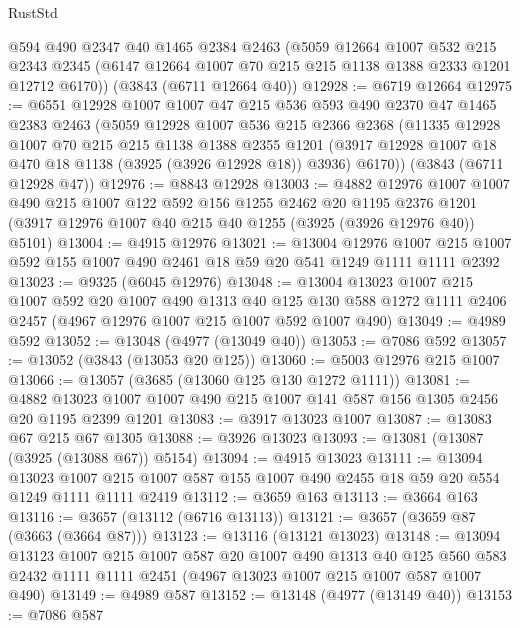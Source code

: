 \begin{lexlean}{RustStd}
\begin{coremodule}
    @594
    @490
    @2347
    @40
    @1465
    @2384
    @2463
    (@5059
      @12664
      @1007
      @532
      @215
      @2343
      @2345
      (@6147 @12664 @1007 @70 @215 @215 @1138 @1388 @2333 @1201 @12712 @6170))
    (@3843 (@6711 @12664 @40))
@12928 := @6719 @12664
@12975 := @6551
    @12928
    @1007
    @1007
    @47
    @215
    @536
    @593
    @490
    @2370
    @47
    @1465
    @2383
    @2463
    (@5059
      @12928
      @1007
      @536
      @215
      @2366
      @2368
      (@11335
        @12928
        @1007
        @70
        @215
        @215
        @1138
        @1388
        @2355
        @1201
        (@3917 @12928 @1007 @18 @470 @18 @1138 (@3925 (@3926 @12928 @18)) @3936)
        @6170))
    (@3843 (@6711 @12928 @47))
@12976 := @8843 @12928
@13003 := @4882
    @12976
    @1007
    @1007
    @490
    @215
    @1007
    @122
    @592
    @156
    @1255
    @2462
    @20
    @1195
    @2376
    @1201
    (@3917 @12976 @1007 @40 @215 @40 @1255 (@3925 (@3926 @12976 @40)) @5101)
@13004 := @4915 @12976
@13021 := @13004
    @12976
    @1007
    @215
    @1007
    @592
    @155
    @1007
    @490
    @2461
    @18
    @59
    @20
    @541
    @1249
    @1111
    @1111
    @2392
@13023 := @9325 (@6045 @12976)
@13048 := @13004
    @13023
    @1007
    @215
    @1007
    @592
    @20
    @1007
    @490
    @1313
    @40
    @125
    @130
    @588
    @1272
    @1111
    @2406
    @2457
    (@4967 @12976 @1007 @215 @1007 @592 @1007 @490)
@13049 := @4989 @592
@13052 := @13048 (@4977 (@13049 @40))
@13053 := @7086 @592
@13057 := @13052 (@3843 (@13053 @20 @125))
@13060 := @5003 @12976 @215 @1007
@13066 := @13057 (@3685 (@13060 @125 @130 @1272 @1111))
@13081 := @4882 @13023 @1007 @1007 @490 @215 @1007 @141 @587 @156 @1305 @2456 @20 @1195 @2399 @1201
@13083 := @3917 @13023 @1007
@13087 := @13083 @67 @215 @67 @1305
@13088 := @3926 @13023
@13093 := @13081 (@13087 (@3925 (@13088 @67)) @5154)
@13094 := @4915 @13023
@13111 := @13094
    @13023
    @1007
    @215
    @1007
    @587
    @155
    @1007
    @490
    @2455
    @18
    @59
    @20
    @554
    @1249
    @1111
    @1111
    @2419
@13112 := @3659 @163
@13113 := @3664 @163
@13116 := @3657 (@13112 (@6716 @13113))
@13121 := @3657 (@3659 @87 (@3663 (@3664 @87)))
@13123 := @13116 (@13121 @13023)
@13148 := @13094
    @13123
    @1007
    @215
    @1007
    @587
    @20
    @1007
    @490
    @1313
    @40
    @125
    @560
    @583
    @2432
    @1111
    @1111
    @2451
    (@4967 @13023 @1007 @215 @1007 @587 @1007 @490)
@13149 := @4989 @587
@13152 := @13148 (@4977 (@13149 @40))
@13153 := @7086 @587

\end{coremodule}
\end{lexlean}
